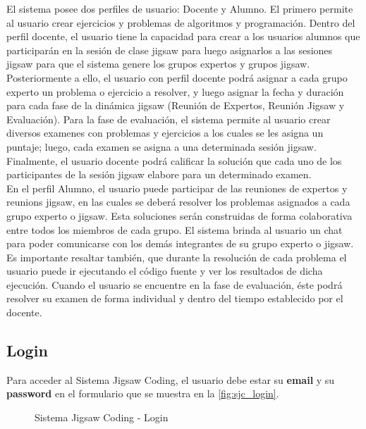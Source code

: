 El sistema posee dos perfiles de usuario: Docente y Alumno. El primero permite al usuario crear ejercicios y problemas de algoritmos y programación. Dentro del perfil docente, el usuario tiene la capacidad para crear a los usuarios alumnos que participarán en la sesión de clase jigsaw para luego asignarlos a las sesiones jigsaw para que el sistema genere los grupos expertos y grupos jigsaw. Posteriormente a ello, el usuario con perfil docente podrá asignar a cada grupo experto un problema o ejercicio a resolver, y luego asignar la fecha y duración para cada fase de la dinámica jigsaw (Reunión de Expertos, Reunión Jigsaw y Evaluación). Para la fase de evaluación, el sistema permite al usuario crear diversos examenes con problemas y ejercicios a los cuales se les asigna un puntaje; luego, cada examen se asigna a una determinada sesión jigsaw. Finalmente, el usuario docente podrá calificar la solución que cada uno de los participantes de la sesión jigsaw elabore para un determinado examen.\\

En el perfil Alumno, el usuario puede participar de las reuniones de expertos y reunions jigsaw, en las cuales se deberá resolver los problemas asignados a cada grupo experto o jigsaw. Esta soluciones serán construidas de forma colaborativa entre todos los miembros de cada grupo. El sistema brinda al usuario un chat para poder comunicarse con los demás integrantes de su grupo experto o jigsaw. Es importante resaltar también, que durante la resolución de cada problema el usuario puede ir ejecutando el código fuente y ver los resultados de dicha ejecución. Cuando el usuario se encuentre en la fase de evaluación, éste podrá resolver su examen de forma individual y dentro del tiempo establecido por el docente.\\

\subsection{Login} 
Para acceder al Sistema Jigsaw Coding, el usuario debe estar su \textbf{email} y su \textbf{password} en el formulario que se muestra en la \autoref{fig:sjc_login}.\\

\begin{figure}
	\centering
	\caption[SJC Login]{Sistema Jigsaw Coding - Login}
	\label{fig:sjc_login}
\end{figure}

